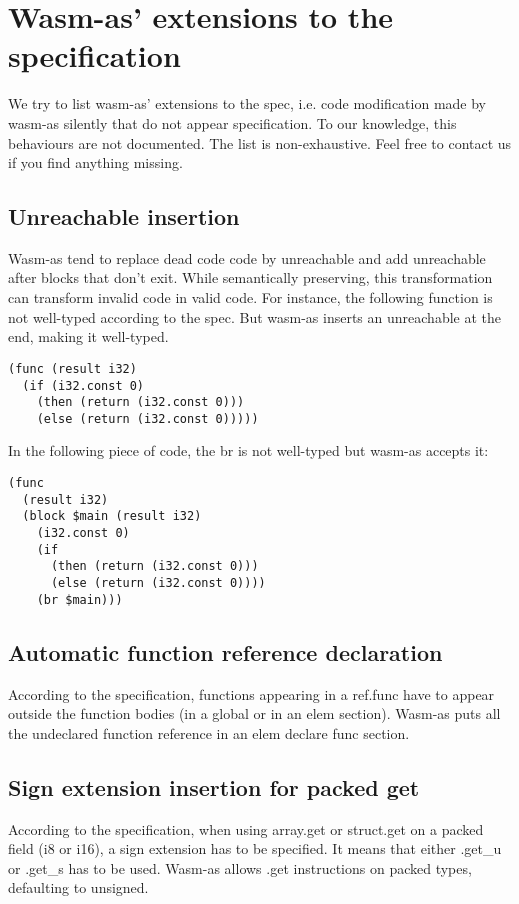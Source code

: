 \documentclass[a4paper,11pt]{article}
\begin{document}
\printbibliography
\newpage
\appendix
\section{Wasm-as' extensions to the specification}\label{wasmasex}
We try to list wasm-as' extensions to the spec, i.e. code modification made by
wasm-as silently that do not appear specification. To our knowledge, this
behaviours are not documented. The list is non-exhaustive. Feel free to contact
us if you find anything missing.
\subsection{\textsf{Unreachable} insertion}
Wasm-as tend to replace dead code code by \textsf{unreachable} and add
\textsf{unreachable} after blocks that don't exit. While semantically
preserving, this transformation can transform invalid code in valid code. For
instance, the following function is not well-typed according to the spec. But
wasm-as inserts an \textsf{unreachable} at the end, making it well-typed.
\begin{lstlisting}
(func (result i32)
  (if (i32.const 0)
    (then (return (i32.const 0)))
    (else (return (i32.const 0)))))
\end{lstlisting}

In the following piece of code, the \textsf{br} is not well-typed but wasm-as accepts
it:
\begin{lstlisting}
(func
  (result i32)
  (block $main (result i32)
    (i32.const 0)
    (if
      (then (return (i32.const 0)))
      (else (return (i32.const 0))))
    (br $main)))
\end{lstlisting}
\subsection{Automatic function reference declaration}
According to the specification, functions appearing in a \textsf{ref.func} have to
appear outside the function bodies (in a global or in an elem section). Wasm-as
puts all the undeclared function reference in an \textsf{elem declare func} section.

\subsection{Sign extension insertion for packed get}
According to the specification, when using \textsf{array.get} or
\textsf{struct.get} on a packed field (\textsf{i8} or \textsf{i16}), a sign
extension has to be specified. It means that either \textsf{.get\_u} or
\textsf{.get\_s} has to be used. Wasm-as allows \textsf{.get} instructions on
packed types, defaulting to unsigned.
\end{document}
